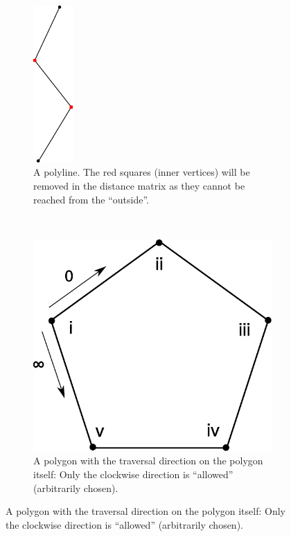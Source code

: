 \begin{figure}
\centering
\begin{subfigure}[b]{0.45\textwidth}
\centering
\includegraphics[height=6cm]{images/path_planning/tsp_polyline.pdf}
\caption{A polyline. The red squares (inner vertices) will be removed in the distance matrix as they cannot be reached from the \enquote{outside}.}
\end{subfigure}
~
\begin{subfigure}[b]{0.45\textwidth}
\includegraphics[width=1\textwidth]{images/path_planning/tsp_polygon.pdf}
\caption{A polygon with the traversal direction on the polygon itself: Only the clockwise direction is \enquote{allowed} (arbitrarily chosen).}
\end{subfigure}

\par\bigskip


\end{figure}
